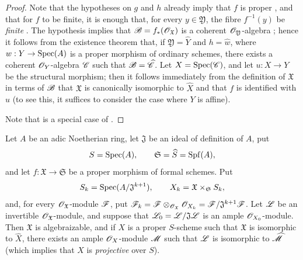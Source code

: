 \begin{proof}
Note that the hypotheses on $g$ and $h$ already imply that $f$ is proper
, and that for $f$ to be finite, it is enough that, for every
$y\in\mathfrak{Y}$, the fibre $f^{-1}(y)$ be \emph{finite}
.  The hypothesis implies that $\mathscr{B}=f_*(\mathscr{O}_{\mathfrak{X}})$
is a coherent $\mathscr{O}_{\mathfrak{Y}}$-algebra
; hence it follows from the existence theorem that, if
$\mathfrak{Y}=\widehat{Y}$ and $h=\widehat{w}$, where
$w:Y\to\operatorname{Spec}(A)$ is a proper morphism of ordinary schemes, there
exists a coherent $\mathscr{O}_Y$-algebra $\mathscr{C}$
such that $\mathscr{B}=\widehat{\mathscr{C}}$.  Let $X=\operatorname{Spec}(\mathscr{C})$,
and let $u:X\to Y$ be the structural morphism; then it follows
immediately from the definition of
$\mathfrak{X}$ in terms of $\mathscr{B}$  that
$\mathfrak{X}$ is canonically isomorphic to $\widehat{X}$ and
that $f$ is identified with $\widehat{u}$ (to see this, it suffices
to consider the case where $Y$ is affine).

Note that  is a special case of
.
\end{proof}

\begin{theorem}[5.4.5]
\label{III.5.4.5}
Let $A$ be an adic Noetherian ring, let $\mathfrak{J}$ be an ideal
of definition of $A$, put
\[
  S=\operatorname{Spec}(A),\qquad
  \mathfrak{S}=\widehat{S}=\operatorname{Spf}(A),
\]
and let $f:\mathfrak{X}\to\mathfrak{S}$ be a proper morphism of
formal schemes.  Put
\[
  S_k=\operatorname{Spec}(A/\mathfrak{J}^{k+1}),\qquad
  X_k=\mathfrak{X}\times_{\mathfrak{S}}S_k,
\]
and, for every $\mathscr{O}_{\mathfrak{X}}$-module $\mathscr{F}$, put $\mathscr{F}_k
=\mathscr{F}\otimes_{\mathscr{O}_{\mathfrak{X}}}\mathscr{O}_{X_k}
=\mathscr{F}/\mathfrak{J}^{k+1}\mathscr{F}$.
Let $\mathscr{L}$ be an invertible
$\mathscr{O}_{\mathfrak{X}}$-module, and suppose that $\mathscr{L}_0=\mathscr{L}/\mathfrak{J}\mathscr{L}$
is an ample $\mathscr{O}_{X_0}$-module.  Then $\mathfrak{X}$ is
algebraizable, and if $X$ is a proper $S$-scheme such
that $\mathfrak{X}$ is isomorphic to $\widehat{X}$, there exists an ample
$\mathscr{O}_X$-module $\mathscr{M}$ such that
$\mathscr{L}$ is isomorphic to $\widehat{\mathscr{M}}$ \textup{(which implies that
$X$ is \emph{projective} over $S$)}.
\end{theorem}

